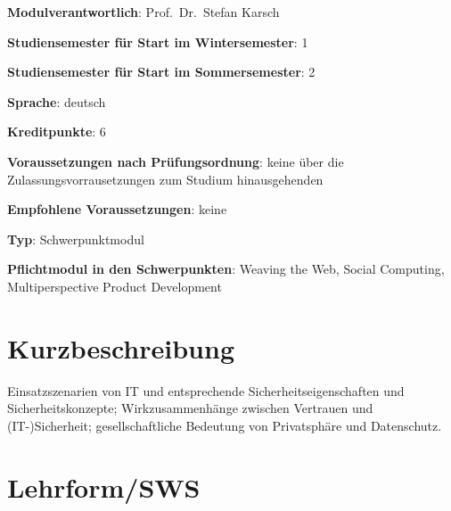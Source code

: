 \begin{modulHead}
\textbf{Modulverantwortlich}: Prof.~Dr.~Stefan
Karsch
\end{modulHead}
\begin{modulHead}
\textbf{Studiensemester für
Start im Wintersemester}:
1
\end{modulHead}
\begin{modulHead}
\textbf{Studiensemester für Start
im Sommersemester}:
2
\end{modulHead}
\begin{modulHead}
\textbf{Sprache}:
deutsch
\end{modulHead}
\begin{modulHead}
\textbf{Kreditpunkte}:
6
\end{modulHead}
\begin{modulHead}
\textbf{Voraussetzungen nach
Prüfungsordnung}: keine über die Zulassungsvorrausetzungen zum Studium
hinausgehenden
\end{modulHead}
\begin{modulHead}
\textbf{Empfohlene
Voraussetzungen}: keine
\end{modulHead}
\begin{modulHead}
\textbf{Typ}:
Schwerpunktmodul
\end{modulHead}
\begin{modulHead}
\textbf{Pflichtmodul
in den Schwerpunkten}: Weaving the Web, Social Computing,
Multiperspective Product Development
\end{modulHead}


\section*{Kurzbeschreibung\label{/mi-2017/modulbeschreibungen-master/MA_WTW_Modul_IT-Sicherheit}}\label{kurzbeschreibungpathlabelmi-2017modulbeschreibungen-mastermaux5fwtwux5fmodulux5fit-sicherheit}

Einsatzszenarien von IT und entsprechende Sicherheitseigenschaften und
Sicherheitskonzepte; Wirkzusammenhänge zwischen Vertrauen und
(IT-)Sicherheit; gesellschaftliche Bedeutung von Privatsphäre und
Datenschutz.

\section*{Lehrform/SWS\label{/mi-2017/modulbeschreibungen-master/MA_WTW_Modul_IT-Sicherheit}}\label{lehrformswspathlabelmi-2017modulbeschreibungen-mastermaux5fwtwux5fmodulux5fit-sicherheit}


